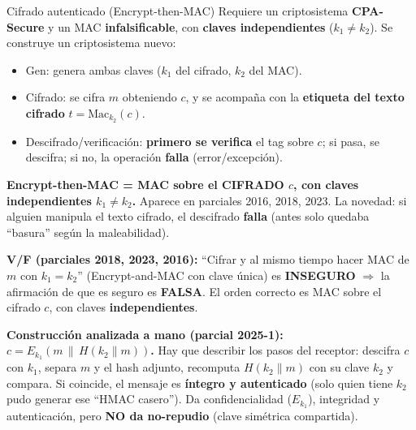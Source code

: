 \documentclass[../main.tex]{subfiles}
\begin{document}
\begin{definicion}{Cifrado autenticado (Encrypt-then-MAC)}
Requiere un criptosistema \textbf{CPA-Secure} y un MAC \textbf{infalsificable}, con
\textbf{claves independientes} ($k_1 \neq k_2$). Se construye un criptosistema nuevo:
\begin{itemize}[leftmargin=1.4em,nosep]
  \item $\mathrm{Gen}$: genera ambas claves ($k_1$ del cifrado, $k_2$ del MAC).
  \item Cifrado: se cifra $m$ obteniendo $c$, y se acompaña con la \textbf{etiqueta del
  texto cifrado} $t=\mathrm{Mac}_{k_2}(c)$.
  \item Descifrado/verificación: \textbf{primero se verifica} el tag sobre $c$; si pasa,
  se descifra; si no, la operación \textbf{falla} (error/excepción).
\end{itemize}
\end{definicion}

\begin{destacado}
\textbf{Encrypt-then-MAC = MAC sobre el CIFRADO $c$, con claves independientes
$k_1 \neq k_2$.} Aparece en parciales 2016, 2018, 2023. La novedad: si alguien
manipula el texto cifrado, el descifrado \textbf{falla} (antes solo quedaba ``basura''
según la maleabilidad).
\end{destacado}

\begin{examen}
\textbf{V/F (parciales 2018, 2023, 2016):} ``Cifrar y al mismo tiempo hacer MAC de $m$
con $k_1=k_2$'' (Encrypt-and-MAC con clave única) es \textbf{INSEGURO}
$\Rightarrow$ la afirmación de que es seguro es \textbf{FALSA}. El orden correcto es
MAC sobre el cifrado $c$, con claves \textbf{independientes}.
\end{examen}

\begin{examen}
\textbf{Construcción analizada a mano (parcial 2025-1): $c = E_{k_1}(m \,\|\, H(k_2\|m))$.}
Hay que describir los pasos del receptor: descifra $c$ con $k_1$, separa $m$ y el hash
adjunto, recomputa $H(k_2 \| m)$ con su clave $k_2$ y compara. Si coincide, el mensaje
es \textbf{íntegro y autenticado} (solo quien tiene $k_2$ pudo generar ese
``HMAC casero''). Da confidencialidad ($E_{k_1}$), integridad y autenticación, pero
\textbf{NO da no-repudio} (clave simétrica compartida).
\end{examen}
\end{document}
